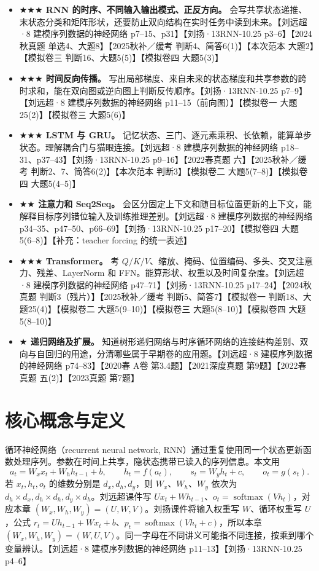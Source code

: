 \documentclass[UTF8,a4paper,zihao=-4,fontset=fandol]{ctexrep}
\begin{document}
\begin{itemize}
\item \textbf{\(\bigstar\bigstar\bigstar\) RNN 的时序、不同输入输出模式、正反方向。} 会写共享状态递推、末状态分类和矩阵形状，还要防止双向结构在实时任务中读到未来。【刘远超·8 建模序列数据的神经网络 p7--15、p31】【刘扬·13RNN-10.25 p3--6】【2024秋真题 单选4、大题8】【2025秋补／缓考 判断4、简答6(1)】【本次范本 大题2】【模拟卷三 判断16、大题5(5)】【模拟卷四 大题5(3)】
\item \textbf{\(\bigstar\bigstar\bigstar\) 时间反向传播。} 写出局部梯度、来自未来的状态梯度和共享参数的跨时求和，能在双向图或逆向图上判断反传顺序。【刘扬·13RNN-10.25 p7--9】【刘远超·8 建模序列数据的神经网络 p11--15（前向图）】【模拟卷一 大题25(2)】【模拟卷三 大题5(6)】
\item \textbf{\(\bigstar\bigstar\bigstar\) LSTM 与 GRU。} 记忆状态、三门、逐元素乘积、长依赖，能算单步状态。理解耦合门与猫眼连接。【刘远超·8 建模序列数据的神经网络 p18--31、p37--43】【刘扬·13RNN-10.25 p9--16】【2022春真题 六】【2025秋补／缓考 判断2、7、简答6(2)】【本次范本 判断3】【模拟卷二 大题5(7--8)】【模拟卷四 大题5(4--5)】
\item \textbf{\(\bigstar\bigstar\) 注意力和 Seq2Seq。} 会区分固定上下文和随目标位置更新的上下文，能解释目标序列错位输入及训练推理差别。【刘远超·8 建模序列数据的神经网络 p34--35、p47--50、p66--69】【刘扬·13RNN-10.25 p17--20】【模拟卷四 大题5(6--8)】【补充：teacher forcing 的统一表述】
\item \textbf{\(\bigstar\bigstar\bigstar\) Transformer。} 考 $Q/K/V$、缩放、掩码、位置编码、多头、交叉注意力、残差、LayerNorm 和 FFN。能算形状、权重以及时间复杂度。【刘远超·8 建模序列数据的神经网络 p47--71】【刘扬·13RNN-10.25 p17--24】【2024秋真题 判断3（残片）】【2025秋补／缓考 判断5、简答7】【模拟卷一 判断18、大题25(4)】【模拟卷二 大题5(9--10)】【模拟卷三 大题5(8--10)】【模拟卷四 大题5(8--10)】
\item \textbf{\(\bigstar\) 递归网络及扩展。} 知道树形递归网络与时序循环网络的连接结构差别、双向与自回归的用途，分清哪些属于早期卷的应用题。【刘远超·8 建模序列数据的神经网络 p74--83】【2020春 A卷 第3.4题】【2021深度真题 第9题】【2022春真题 五(2)】【2023真题 第7题】
\end{itemize}

\section{核心概念与定义}

循环神经网络（recurrent neural network, RNN）通过重复使用同一个状态更新函数处理序列。参数在时间上共享，隐状态携带已读入的序列信息。本文用
\[
 a_t=W_xx_t+W_hh_{t-1}+b,\qquad h_t=f(a_t),\qquad
 s_t=W_yh_t+c,\qquad o_t=g(s_t).
\]
若 $x_t,h_t,o_t$ 的维数分别是 $d_x,d_h,d_y$，则 $W_x$、$W_h$、$W_y$ 依次为 $d_h\times d_x,d_h\times d_h,d_y\times d_h$。刘远超课件写 $U x_t+W h_{t-1}$、$o_t=\operatorname{softmax}(Vh_t)$，对应本章 $(W_x,W_h,W_y)=(U,W,V)$。刘扬课件将输入权重写 $W$、循环权重写 $U$，公式 $r_t=U h_{t-1}+W x_t+b$、$p_t=\operatorname{softmax}(Vh_t+c)$，所以本章 $(W_x,W_h,W_y)=(W,U,V)$。同一字母在不同讲义可能指不同连接，按乘到哪个变量辨认。【刘远超·8 建模序列数据的神经网络 p11--13】【刘扬·13RNN-10.25 p4--6】
\end{document}
